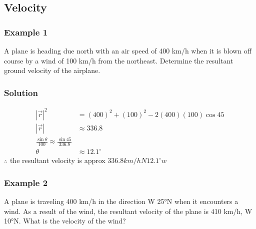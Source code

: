 \documentclass{article}
\begin{document}
\subsection{Velocity}
\subsubsection*{Example 1}
A plane is heading due north with an air speed of 400 km/h when it is blown off course by a wind of 100 km/h from the northeast. Determine the resultant ground velocity of the airplane.

\begin{multicols}{2}

\columnbreak

\subsubsection*{Solution}
\begin{align*}
    |\vec{r}|^2&=(400)^2+(100)^2-2(400)(100)\cos 45\\
    |\vec{r}|&\approx 336.8\\
    \frac{\sin \theta}{100}\approx \frac{\sin 45}{336.8}\\
    \theta &\approx 12.1^{\circ}
\end{align*}
$\therefore$ the resultant velocity is approx $336.8 km/h N 12.1^{\circ}w$

\end{multicols}

\subsubsection*{Example 2}
A plane is traveling 400 km/h in the direction W 25°N when it encounters a wind. As a result of the wind, the resultant velocity of the plane is 410 km/h, W 10°N. What is the velocity of the wind?
\end{document}
